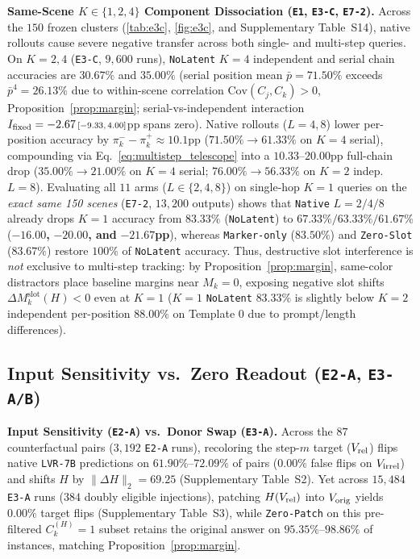 \textbf{Same-Scene $K \in \{1, 2, 4\}$ Component Dissociation (\texttt{E1}, \texttt{E3-C}, \texttt{E7-2}).} Across the $150$ frozen clusters (\cref{tab:e3c}, \cref{fig:e3c}, and Supplementary Table~S14), native rollouts cause severe negative transfer across both single- and multi-step queries. On $K=2, 4$ (\texttt{E3-C}, $9,600$ runs), \texttt{NoLatent} $K=4$ independent and serial chain accuracies are $30.67\%$ and $35.00\%$ (serial position mean $\bar{p}=71.50\%$ exceeds $\bar{p}^4 = 26.13\%$ due to within-scene correlation $\mathrm{Cov}(C_j, C_k) > 0$, Proposition~\ref{prop:margin}; serial-vs-independent interaction $I_{\mathrm{fixed}} = -2.67\ci{-9.33}{4.00}$pp spans zero). Native rollouts ($L=4, 8$) lower per-position accuracy by $\pi_k^- - \pi_k^+ \approx 10.1$pp ($71.50\% \to 61.33\%$ on $K=4$ serial), compounding via Eq.~\eqref{eq:multistep_telescope} into a $10.33$--$20.00$pp full-chain drop ($35.00\% \to 21.00\%$ on $K=4$ serial; $76.00\% \to 56.33\%$ on $K=2$ indep.\ $L=8$).
Evaluating all $11$ arms ($L \in \{2, 4, 8\}$) on single-hop $K=1$ queries on the \emph{exact same 150 scenes} (\texttt{E7-2}, $13,200$ outputs) shows that \texttt{Native} $L=2/4/8$ already drops $K=1$ accuracy from $83.33\%$ (\texttt{NoLatent}) to $67.33\% / 63.33\% / 61.67\%$ ($\mathbf{-16.00}$\textbf{, }$\mathbf{-20.00}$\textbf{, and }$\mathbf{-21.67}$\textbf{pp}), whereas \texttt{Marker-only} ($83.50\%$) and \texttt{Zero-Slot} ($83.67\%$) restore $100\%$ of \texttt{NoLatent} accuracy. Thus, destructive slot interference is \emph{not} exclusive to multi-step tracking: by Proposition~\ref{prop:margin}, same-color distractors place baseline margins near $M_k=0$, exposing negative slot shifts $\Delta M_k^{\mathrm{slot}}(H) < 0$ even at $K=1$ ($K=1$ \texttt{NoLatent} $83.33\%$ is slightly below $K=2$ independent per-position $88.00\%$ on Template 0 due to prompt/length differences).

\subsection{Input Sensitivity vs.\ Zero Readout (\texttt{E2-A}, \texttt{E3-A/B})}
\label{subsec:exp_e3b}

\textbf{Input Sensitivity (\texttt{E2-A}) vs.\ Donor Swap (\texttt{E3-A}).} Across the $87$ counterfactual pairs ($3,192$ \texttt{E2-A} runs), recoloring the step-$m$ target ($V_{\mathrm{rel}}$) flips native \texttt{LVR-7B} predictions on $61.90\%$--$72.09\%$ of pairs ($0.00\%$ false flips on $V_{\mathrm{irrel}}$) and shifts $H$ by $\|\Delta H\|_2 = 69.25$ (Supplementary Table~S2). Yet across $15,484$ \texttt{E3-A} runs ($384$ doubly eligible injections), patching $H(V_{\mathrm{rel}})$ into $V_{\mathrm{orig}}$ yields \textbf{$0.00\%$} target flips (Supplementary Table~S3), while \texttt{Zero-Patch} on this pre-filtered $C_k^{(H)}=1$ subset retains the original answer on $95.35\%$--$98.86\%$ of instances, matching Proposition~\ref{prop:margin}.


